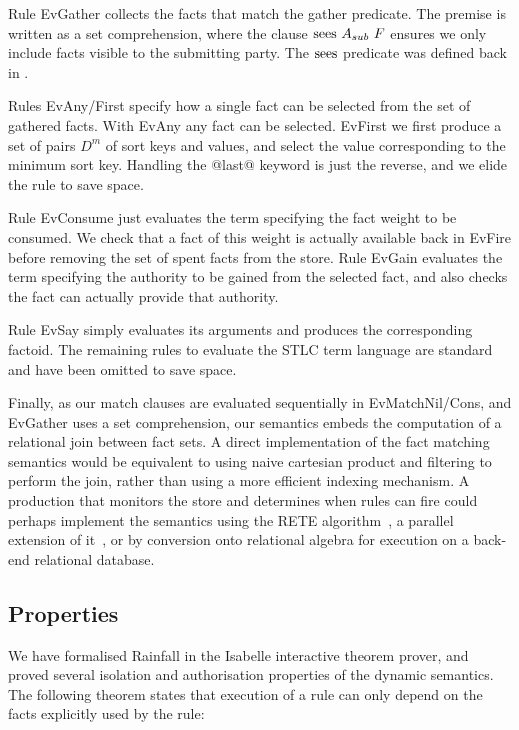 Rule EvGather collects the facts that match the gather predicate. The premise is written as a set comprehension, where the clause $\textrm{sees}~ A_{sub}~ F$ ensures we only include facts visible to the submitting party. The $\textrm{sees}$ predicate was defined back in \REF.

Rules EvAny/First specify how a single fact can be selected from the set of gathered facts. With EvAny any fact can be selected. EvFirst we first produce a set of pairs $D^m$ of sort keys and values, and select the value corresponding to the minimum sort key. Handling the @last@ keyword is just the reverse, and we elide the rule to save space.

Rule EvConsume just evaluates the term specifying the fact weight to be consumed. We check that a fact of this weight is actually available back in EvFire before removing the set of spent facts from the store. Rule EvGain evaluates the term specifying the authority to be gained from the selected fact, and also checks the fact can actually provide that authority.

Rule EvSay simply evaluates its arguments and produces the corresponding factoid. The remaining rules to evaluate the STLC term language are standard and have been omitted to save space.

Finally, as our match clauses are evaluated sequentially in EvMatchNil/Cons, and EvGather uses a set comprehension, our semantics embeds the computation of a relational join between fact sets. A direct implementation of the fact matching semantics would be equivalent to using naive cartesian product and filtering to perform the join, rather than using a more efficient indexing mechanism. A production that monitors the store and determines when rules can fire could perhaps implement the semantics using the RETE algorithm~\cite{Forgy1981:RETE, Doorenbos1995:ProductionMatching}, a parallel extension of it~\cite{Aref1998:LanaMatch}, or by conversion onto relational algebra for execution on a back-end relational database.




\eject{}
\subsection{Properties}

We have formalised Rainfall in the Isabelle interactive theorem prover, and proved several isolation and authorisation properties of the dynamic semantics.
The following theorem states that execution of a rule can only depend on the facts explicitly used by the rule:

